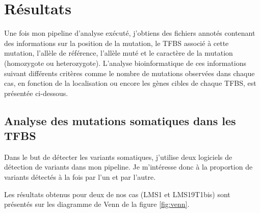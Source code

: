 \chapter{Résultats}

Une fois mon pipeline d'analyse exécuté, j'obtiens des fichiers annotés contenant des informations sur la position de la mutation, le TFBS associé à cette mutation, l'allèle de référence, l'allèle muté et le caractère de la mutation (\gls{homozygote} ou \gls{heterozygote}). L'analyse bioinformatique de ces informations suivant différents critères comme le nombre de mutations observées dans chaque cas, en fonction de la localisation ou encore les gènes cibles de chaque TFBS, est présentée ci-dessous.

\section{Analyse des mutations somatiques dans les TFBS}

Dans le but de détecter les variants somatiques, j'utilise deux logiciels de détection de variants dans mon pipeline. Je m'intéresse donc à la proportion de variants détectés à la fois par l'un et par l'autre.

Les résultats obtenus pour deux de nos cas (LMS1 et LMS19T1bis) sont présentés sur les diagramme de Venn de la figure \ref{fig:venn}. 

